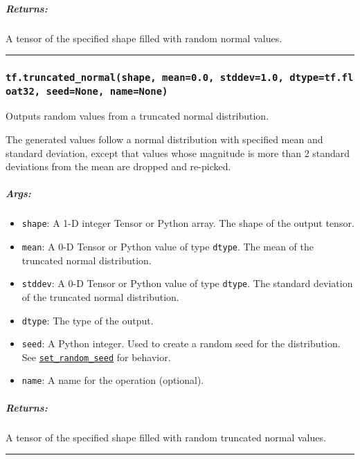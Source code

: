 \subparagraph{Returns: }\label{returns-8}

A tensor of the specified shape filled with random normal values.

\begin{center}\rule{0.5\linewidth}{\linethickness}\end{center}

\subsubsection{\texorpdfstring{\texttt{tf.truncated\_normal(shape,\ mean=0.0,\ stddev=1.0,\ dtype=tf.float32,\ seed=None,\ name=None)}
}{tf.truncated\_normal(shape, mean=0.0, stddev=1.0, dtype=tf.float32, seed=None, name=None) }}\label{tf.truncatedux5fnormalshape-mean0.0-stddev1.0-dtypetf.float32-seednone-namenone}

Outputs random values from a truncated normal distribution.

The generated values follow a normal distribution with specified mean
and standard deviation, except that values whose magnitude is more than
2 standard deviations from the mean are dropped and re-picked.

\subparagraph{Args: }\label{args-9}

\begin{itemize}
\tightlist
\item
  \texttt{shape}: A 1-D integer Tensor or Python array. The shape of the
  output tensor.
\item
  \texttt{mean}: A 0-D Tensor or Python value of type \texttt{dtype}.
  The mean of the truncated normal distribution.
\item
  \texttt{stddev}: A 0-D Tensor or Python value of type \texttt{dtype}.
  The standard deviation of the truncated normal distribution.
\item
  \texttt{dtype}: The type of the output.
\item
  \texttt{seed}: A Python integer. Used to create a random seed for the
  distribution. See
  \href{../../api_docs/python/constant_op.md\#set_random_seed}{\texttt{set\_random\_seed}}
  for behavior.
\item
  \texttt{name}: A name for the operation (optional).
\end{itemize}

\subparagraph{Returns: }\label{returns-9}

A tensor of the specified shape filled with random truncated normal
values.

\begin{center}\rule{0.5\linewidth}{\linethickness}\end{center}

